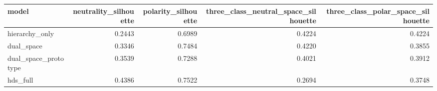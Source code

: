 \begin{tabular}{lrrrr}
\toprule
model & neutrality\_silhouette & polarity\_silhouette & three\_class\_neutral\_space\_silhouette & three\_class\_polar\_space\_silhouette \\
\midrule
hierarchy\_only & 0.2443 & 0.6989 & 0.4224 & 0.4224 \\
dual\_space & 0.3346 & 0.7484 & 0.4220 & 0.3855 \\
dual\_space\_prototype & 0.3539 & 0.7288 & 0.4021 & 0.3912 \\
hds\_full & 0.4386 & 0.7522 & 0.2694 & 0.3748 \\
\bottomrule
\end{tabular}
